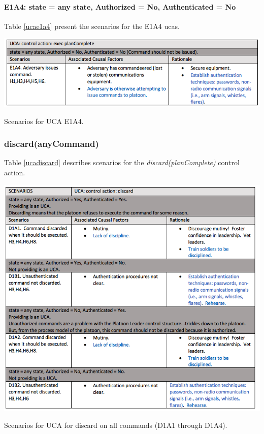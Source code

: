 \documentclass[../../main/main.tex]{subfiles}
\begin{document}
\paragraph*{E1A4: state  = any state, Authorized = No, Authenticated = No}
Table \ref{ucae1a4}  present the scenarios for the E1A4 \glspl{uca}.

\begin{table}[ht!]
\begin{center}
\includegraphics[width=\linewidth]{../figures/ucae1a4}
\caption{Scenarios for UCA E1A4.}
\label{ucae1a4}
\end{center}
\end{table}
\clearpage


\subsubsection*{discard(anyCommand)}
Table \ref{ucadiscard} describes scenarios for the \textit{discard(planComplete)} control action.

\begin{table}[ht!]
\begin{center}
\includegraphics[width=\linewidth]{../figures/ucadiscard}
\caption{Scenarios for UCA for discard on all commands (D1A1 through D1A4).}
\label{ucadiscard}
\end{center}
\end{table}
\clearpage
\end{document}

